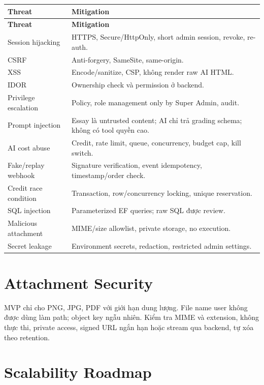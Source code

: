 \documentclass[11pt,a4paper]{article}
\begin{document}
\begin{longtable}{|P{0.28\textwidth}|P{0.59\textwidth}|}
\hline
\textbf{Threat} & \textbf{Mitigation} \\ \hline
\endfirsthead
\hline
\textbf{Threat} & \textbf{Mitigation} \\ \hline
\endhead
Session hijacking & HTTPS, Secure/HttpOnly, short admin session, revoke, re-auth. \\ \hline
CSRF & Anti-forgery, SameSite, same-origin. \\ \hline
XSS & Encode/sanitize, CSP, không render raw AI HTML. \\ \hline
IDOR & Ownership check và permission ở backend. \\ \hline
Privilege escalation & Policy, role management only by Super Admin, audit. \\ \hline
Prompt injection & Essay là untrusted content; AI chỉ trả grading schema; không có tool quyền cao. \\ \hline
AI cost abuse & Credit, rate limit, queue, concurrency, budget cap, kill switch. \\ \hline
Fake/replay webhook & Signature verification, event idempotency, timestamp/order check. \\ \hline
Credit race condition & Transaction, row/concurrency locking, unique reservation. \\ \hline
SQL injection & Parameterized EF queries; raw SQL được review. \\ \hline
Malicious attachment & MIME/size allowlist, private storage, no execution. \\ \hline
Secret leakage & Environment secrets, redaction, restricted admin settings. \\ \hline
\end{longtable}

\section{Attachment Security}

MVP chỉ cho PNG, JPG, PDF với giới hạn dung lượng. File name user không được dùng làm path; object key ngẫu nhiên. Kiểm tra MIME và extension, không thực thi, private access, signed URL ngắn hạn hoặc stream qua backend, tự xóa theo retention.

\section{Scalability Roadmap}
\end{document}
